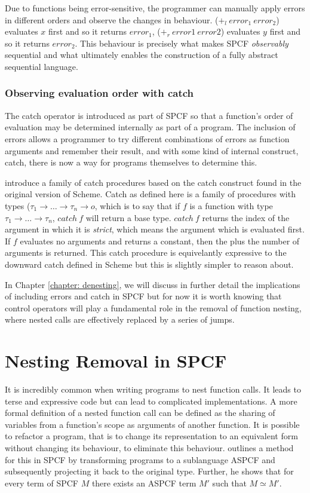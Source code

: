 \documentclass[12pt,a4paper]{report}
\theoremstyle{definition}
\theoremstyle{remark}
\begin{document}
Due to functions being error-sensitive, the programmer can manually apply errors in different orders and observe the changes in behaviour. ($+_l\ error_1\ error_2$) evaluates $x$ first and so it returns $error_1$, ($+_r\ error1\ error2$) evaluates $y$ first and so it returns $error_2$. This behaviour is precisely what makes SPCF \textit{observably} sequential and what ultimately enables the construction of a fully abstract sequential language. 

\subsubsection{Observing evaluation order with catch}
The catch operator is introduced as part of SPCF so that a function's order of evaluation may be determined internally as part of a program. The inclusion of errors allows a programmer to try different combinations of errors as function arguments and remember their result, and with some kind of internal construct, catch, there is now a way for programs themselves to determine this.

\cite{cartwright_1992} introduce a family of catch procedures based on the catch construct found in the original version of Scheme. Catch as defined here is a family of procedures with types ($\tau_1 \rightarrow \dots \rightarrow \tau_n \rightarrow o$, which is to say that if $f$ is a function with type $\tau_1 \rightarrow \dots \rightarrow \tau_n$, $catch\ f$ will return a base type. $catch\ f$ returns the index of the argument in which it is \emph{strict}, which means the argument which is evaluated first. If $f$ evaluates no arguments and returns a constant, then the plus the number of arguments is returned. This catch procedure is equivelantly expressive to the downward catch defined in Scheme but this is slightly simpler to reason about. 

In Chapter \ref{chapter: denesting}, we will discuss in further detail the implications of including errors and catch in SPCF but for now it is worth knowing that control operators will play a fundamental role in the removal of function nesting, where nested calls are effectively replaced by a series of jumps.

\section{Nesting Removal in SPCF}\label{sec:nesting_removal}
It is incredibly common when writing programs to nest function calls. It leads to terse and expressive code but can lead to complicated implementations. A more formal definition of a nested function call can be defined as the sharing of variables from a function's scope as arguments of another function. It is possible to refactor a program, that is to change its representation to an equivalent form without changing its behaviour, to eliminate this behaviour. \cite{laird_2007} outlines a method for this in SPCF by transforming programs to a sublanguage ASPCF and subsequently projecting it back to the original type. Further, he shows that for every term of SPCF $M$ there exists an ASPCF term $M'$ such that $M \simeq M'$.
\end{document}
